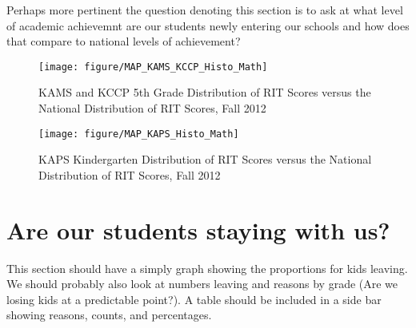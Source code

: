 \documentclass[sfsidenotes, justified]{tufte-handout}\usepackage{graphicx, color}
\newenvironment{knitrout}{}{} %
\begin{document}
Perhaps more pertinent the question denoting this section is to ask at what level of academic achievemnt are our  students newly entering our schools and how does that compare to national levels of achievement?





\begin{figure}
\begin{knitrout}
\color{fgcolor}

{\centering \texttt{[image: figure/MAP\_KAMS\_KCCP\_Histo\_Math]} 

}


\end{knitrout}

\caption{KAMS and KCCP 5th Grade Distribution of RIT Scores versus the National Distribution of RIT Scores, Fall 2012}
\end{figure}


\begin{figure}
\begin{knitrout}
\color{fgcolor}

{\centering \texttt{[image: figure/MAP\_KAPS\_Histo\_Math]} 

}


\end{knitrout}

\caption{KAPS Kindergarten Distribution of RIT Scores versus the National Distribution of RIT Scores, Fall 2012}
\end{figure}


  
  
\section{Are our students staying with us?}
This section should have a simply graph showing the proportions for kids leaving.  We should probably also look at numbers leaving and reasons by grade (Are we losing kids at a predictable point?).  A table should be included in a side bar showing reasons, counts, and percentages.
\end{document}
